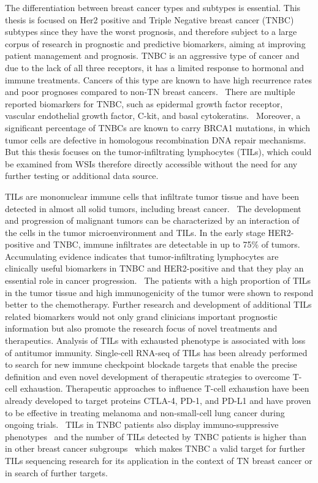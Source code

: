 The differentiation between breast cancer
types and subtypes is essential. This thesis is focused on Her2 positive
and Triple Negative breast cancer (TNBC) subtypes since they have the worst prognosis,
and therefore subject to a large corpus of research in prognostic and predictive biomarkers,
aiming at improving patient management and prognosis. TNBC is an aggressive type of cancer and
due to the lack of all three receptors, it has a limited response to hormonal and immune treatments.
Cancers of this type are known to have high recurrence rates and
poor prognoses compared to non-TN breast cancers.~\cite{cao2020triple}
There are multiple reported biomarkers for TNBC, such as epidermal growth factor receptor,
vascular endothelial growth factor, C-kit, and basal cytokeratins.~\cite{yadav2015biomarkers} Moreover, a significant
percentage of TNBCs are known to carry BRCA1 mutations,
in which tumor cells are defective in homologous recombination DNA repair mechanisms.
But this thesis focuses on the tumor-infiltrating lymphocytes (TILs), which could be examined 
from WSIs therefore directly accessible without the need for any further testing or additional data source. 

TILs are mononuclear immune cells that infiltrate tumor tissue and have been detected in almost all solid tumors,
including breast cancer.~\cite{laenkholm2022incorporation}
The development and progression of malignant tumors can be characterized by an interaction of the cells
in the tumor microenvironment and TILs.
In the early stage HER2-positive and TNBC, immune infiltrates are detectable in up to 75\% of tumors.~\cite{dieci2018update}
Accumulating evidence indicates that tumor-infiltrating lymphocytes are clinically useful biomarkers in TNBC and HER2-positive
and that they play an essential role in cancer progression.~\cite{gao2020prognostic}
The patients with a high proportion of TILs in the tumor tissue and high immunogenicity of the tumor
were shown to respond better to the chemotherapy. Further research and development of additional
TILs related biomarkers would not only grand clinicians important prognostic information but also promote the
research focus of novel treatments and therapeutics.
Analysis of TILs with exhausted phenotype is associated with loss of antitumor immunity.
Single-cell RNA-seq of TILs has been already performed to search for new immune checkpoint blockade targets that enable
the precise definition and even novel development of therapeutic strategies to overcome T-cell exhaustion.
Therapeutic approaches to influence T-cell exhaustion have been already developed to target proteins CTLA-4, PD-1, and PD-L1
and have proven to be effective in treating melanoma and non-small-cell lung cancer during ongoing trials.~\cite{postow2015immune}
TILs in TNBC patients also display immuno-suppressive phenotypes~\cite{chung2017single} and the number of TILs detected by TNBC
patients is higher than in other breast cancer subgroups~\cite{schneeweiss2019diagnosis} which makes TNBC a valid target for further
TILs sequencing research for its application in the context of TN breast cancer or in search of further targets.

